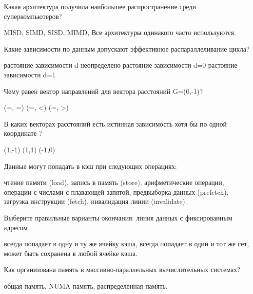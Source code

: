 \documentclass[a4paper, 12pt, addpoints]{exam}
\begin{document}
\begin{questions}
\question[1] Какая архитектура получила наибольшее распространение среди суперкомпьютеров?
\begin{choices}
    \choice MISD,
    \choice SIMD,
    \choice SISD,
    \correctchoice MIMD,
    \choice Все архитектуры одинакого часто используются.
\end{choices}

\question[1] Какие зависимости по данным допускают эффективное распараллеливание цикла?
\begin{choices}
    \choice растояние зависимости d неопределено
    \correctchoice растояние зависимости d=0
    \choice растояние зависимости d=1
\end{choices}

\question[1] Чему равен вектор направлений для вектора расстояний G=(0,-1)?
\begin{choices}
    \choice (=, =)
    \choice (=, <)
    \correctchoice (=, >)
\end{choices}

\question[1] В каких векторах расстояний есть истинная зависимость хотя бы по одной координате ?
\begin{choices}
    \correctchoice (1,-1)
    \correctchoice (1,1)
    \choice (-1,0)
\end{choices}

\question[1] Данные могут попадать в кэш при следующих операциях:
\begin{choices}
    \correctchoice чтение памяти (load),
    \correctchoice запись в память (store),
    \choice арифметические операции,
    \choice операции с числами с плавающей запятой,
    \correctchoice предвыборка данных (prefetch),
    \correctchoice загрузка инструкции (fetch),
    \choice инвалидация линии (invalidate).
\end{choices}

\question[1] Выберите правильные варианты окончания: линия данных с фиксированным адресом
\begin{choices}
    \choice всегда попадает в одну и ту же ячейку кэша,
    \correctchoice всегда попадает в один и тот же сет,
    \choice может быть сохранена в любой ячейке кэша.
\end{choices}

\question[1] Как организована память в массивно-параллельных вычислительных системах?
\begin{choices}
    \choice общая память,
    \choice NUMA память,
    \correctchoice распределенная память.
\end{choices}


\end{questions}
\end{document}
